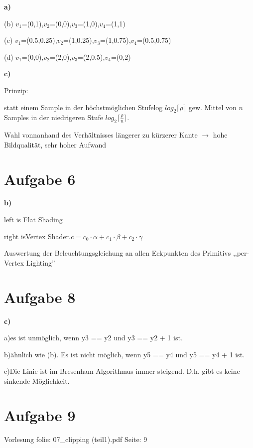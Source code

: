 \documentclass[fleqn]{article}
\begin{document}
\noindent\textbf{a)}

(b) $v_1$=(0,1),$v_2$=(0,0),$v_3$=(1,0),$v_4$=(1,1)

(c) $v_1$=(0.5,0.25),$v_2$=(1,0.25),$v_3$=(1,0.75),$v_4$=(0.5,0.75)

(d) $v_1$=(0,0),$v_2$=(2,0),$v_3$=(2,0.5),$v_4$=(0,2)

\noindent\textbf{c)}

\noindent Prinzip: 

statt einem Sample in der höchstmöglichen Stufelog $log_2\lceil \rho\rceil$ gew. Mittel von $n$ Samples in der niedrigeren Stufe $log_2\lceil \frac{\rho}{n}\rceil$.

Wahl vonnanhand des Verhältnisses längerer zu kürzerer Kante $\rightarrow$
hohe Bildqualität, sehr hoher Aufwand

\section{Aufgabe 6}

\noindent\textbf{b)}

\noindent left is Flat Shading

\noindent right isVertex Shader.$c=c_0\cdot\alpha+c_1\cdot\beta+c_2\cdot\gamma$

Auswertung der Beleuchtungsgleichung an allen Eckpunkten des Primitivs ,,per-Vertex Lighting''

\section{Aufgabe 8}

\noindent\textbf{c)}

a)es ist unmöglich, wenn y3 == y2 und y3 == y2 + 1 ist.


b)ähnlich wie (b). Es ist nicht möglich, wenn y5 == y4 und y5 == y4 + 1 ist.

c)Die Linie ist im Bresenham-Algorithmus immer steigend. D.h. gibt es keine sinkende Möglichkeit.

\section{Aufgabe 9}

Vorlesung folie: 07\_clipping (teil1).pdf Seite: 9
\end{document}
